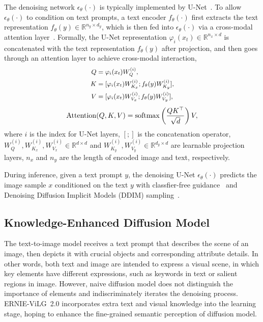 \documentclass[10pt,twocolumn,letterpaper]{article}
\begin{document}
The denoising network $\epsilon_\theta(\cdot)$ is typically implemented by U-Net~\cite{DBLP:conf/nips/HoJA20}. 
To allow $\epsilon_\theta(\cdot)$ to condition on text prompts, a text encoder $f_\theta(\cdot)$ first extracts the text representation $f_\theta(y) \in \mathbb{R}^{n_y \times d_y}$, which is then fed into $\epsilon_\theta(\cdot)$ via a cross-modal attention layer~\cite{DBLP:conf/icml/NicholDRSMMSC22}.
Formally, the U-Net representation $\varphi_i(x_t) \in \mathbb{R}^{n_x \times d}$ is concatenated with the text representation $f_\theta(y)$ after projection, and then goes through an attention layer to achieve cross-modal interaction, 
\begin{equation}
\small
\begin{aligned}
    Q &= \varphi_i(x_t) W_Q^{(i)}  , \\
    K &= [\varphi_i(x_t) W_{K_x}^{(i)} ; f_\theta(y) W_{K_y}^{(i)}], \\
    V &= [\varphi_i(x_t) W_{V_x}^{(i)} ; f_\theta(y) W_{V_y}^{(i)}],
\end{aligned}
\end{equation}
\begin{equation}
\label{eq:attention}
\small
    {\rm Attention}(Q, K, V) = {\rm softmax} \left( \frac{QK^\top}{\sqrt{d}} \right) V,
\end{equation}
where $i$ is the index for U-Net layers, $[;]$ is the concatenation operator, $W_Q^{(i)}, W_{K_x}^{(i)}, W_{V_x}^{(i)} \in \mathbb{R}^{d \times d}$ and $ W_{K_y}^{(i)}, W_{V_y}^{(i)} \in \mathbb{R}^{d_y \times d} $ are learnable projection layers, $n_x$ and $n_y$ are the length of encoded image and text, respectively.

During inference, given a text prompt $y$, the denoising U-Net $\epsilon_\theta(\cdot)$ predicts the image sample $x$ conditioned on the text $y$ with classfier-free guidance~\cite{DBLP:journals/corr/abs-2207-12598} and Denoising Diffusion Implicit Models (DDIM) sampling~\cite{DBLP:conf/iclr/SongME21}.

\subsection{Knowledge-Enhanced Diffusion Model}

The text-to-image model receives a text prompt that describes the scene of an image, then depicts it with crucial objects and corresponding attribute details.
In other words, both text and image are intended to express a visual scene, in which key elements have different expressions, such as keywords in text or salient regions in image.
However, naive diffusion model does not distinguish the importance of elements and indiscriminately iterates the denoising process. ERNIE-ViLG~2.0 incorporates extra text and visual knowledge into the learning stage, hoping to enhance the fine-grained semantic perception of diffusion model.
\end{document}
